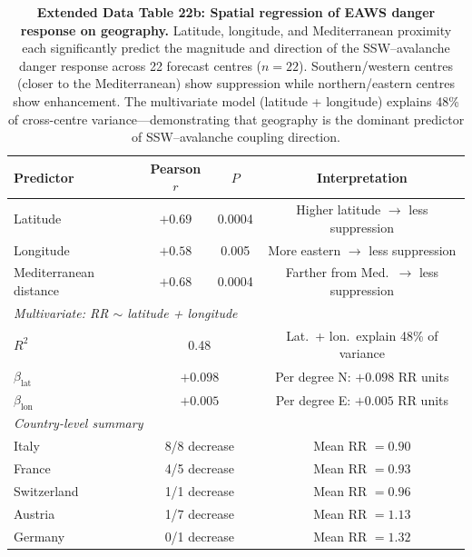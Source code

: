 \documentclass[11pt,letterpaper]{article}
\begin{document}
\begin{table}[!ht]
\centering
\caption{\textbf{Extended Data Table 22b: Spatial regression of EAWS danger response on geography.}
Latitude, longitude, and Mediterranean proximity each significantly predict the magnitude and direction of the SSW--avalanche danger response across 22 forecast centres ($n = 22$). Southern/western centres (closer to the Mediterranean) show suppression while northern/eastern centres show enhancement. The multivariate model (latitude + longitude) explains 48\% of cross-centre variance---demonstrating that geography is the dominant predictor of SSW--avalanche coupling direction.}
\label{tab:eaws_spatial}
\small
\begin{tabular}{lccc}
\toprule
Predictor & Pearson $r$ & $P$ & Interpretation \\
\midrule
Latitude & $+0.69$ & 0.0004 & Higher latitude $\to$ less suppression \\
Longitude & $+0.58$ & 0.005 & More eastern $\to$ less suppression \\
Mediterranean distance & $+0.68$ & 0.0004 & Farther from Med.\ $\to$ less suppression \\
\midrule
\multicolumn{4}{l}{\textit{Multivariate: RR $\sim$ latitude + longitude}} \\
$R^2$ & \multicolumn{2}{c}{0.48} & Lat.\ + lon.\ explain 48\% of variance \\
$\beta_{\mathrm{lat}}$ & \multicolumn{2}{c}{$+0.098$} & Per degree N: $+0.098$ RR units \\
$\beta_{\mathrm{lon}}$ & \multicolumn{2}{c}{$+0.005$} & Per degree E: $+0.005$ RR units \\
\midrule
\multicolumn{4}{l}{\textit{Country-level summary}} \\
Italy & \multicolumn{2}{c}{8/8 decrease} & Mean RR $= 0.90$ \\
France & \multicolumn{2}{c}{4/5 decrease} & Mean RR $= 0.93$ \\
Switzerland & \multicolumn{2}{c}{1/1 decrease} & Mean RR $= 0.96$ \\
Austria & \multicolumn{2}{c}{1/7 decrease} & Mean RR $= 1.13$ \\
Germany & \multicolumn{2}{c}{0/1 decrease} & Mean RR $= 1.32$ \\
\bottomrule
\end{tabular}
\end{table}
\end{document}
